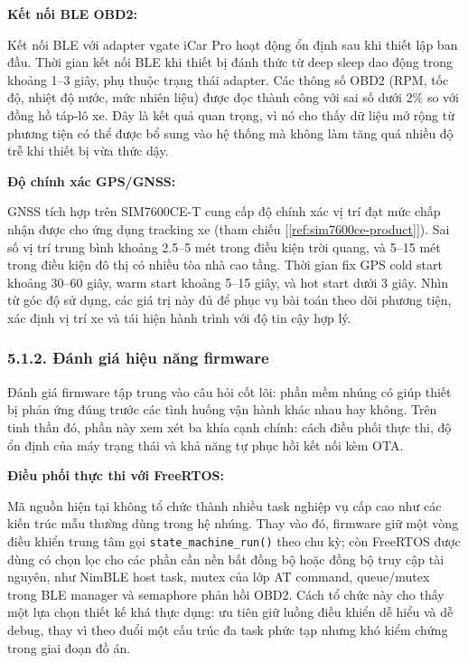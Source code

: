 \documentclass[a4paper]{extarticle}
\newcommand{\ieeecite}[1]{[\ref{#1}]}
\providecommand{\textcite}[1]{\ieeecite{#1}}
\begin{document}
\textbf{Kết nối BLE OBD2:}

Kết nối BLE với adapter vgate iCar Pro hoạt động ổn định sau khi thiết
lập ban đầu. Thời gian kết nối BLE khi thiết bị đánh thức từ deep sleep
dao động trong khoảng 1--3 giây, phụ thuộc trạng thái adapter. Các thông
số OBD2 (RPM, tốc độ, nhiệt độ nước, mức nhiên liệu) được đọc thành công
với sai số dưới 2\% so với đồng hồ táp-lô xe. Đây là kết quả quan trọng,
vì nó cho thấy dữ liệu mở rộng từ phương tiện có thể được bổ sung vào
hệ thống mà không làm tăng quá nhiều độ trễ khi thiết bị vừa thức dậy.

\textbf{Độ chính xác GPS/GNSS:}

GNSS tích hợp trên SIM7600CE-T cung cấp độ chính xác vị trí đạt mức chấp
nhận được cho ứng dụng tracking xe (tham chiếu
\textcite{ref:sim7600ce-product}). Sai số vị trí trung bình khoảng
2.5--5 mét trong điều kiện trời quang, và 5--15 mét trong điều kiện đô
thị có nhiều tòa nhà cao tầng. Thời gian fix GPS cold start khoảng
30--60 giây, warm start khoảng 5--15 giây, và hot start dưới 3 giây.
Nhìn từ góc độ sử dụng, các giá trị này đủ để phục vụ bài toán theo dõi
phương tiện, xác định vị trí xe và tái hiện hành trình với độ tin cậy
hợp lý.

\subsubsection{5.1.2. Đánh giá hiệu năng
firmware}\label{512-ux111uxe1nh-giuxe1-hiux1ec7u-nux103ng-firmware}

Đánh giá firmware tập trung vào câu hỏi cốt lõi: phần mềm nhúng có giúp
thiết bị phản ứng đúng trước các tình huống vận hành khác nhau hay
không. Trên tinh thần đó, phần này xem xét ba khía cạnh chính: cách
điều phối thực thi, độ ổn định của máy trạng thái và khả năng tự phục
hồi kết nối kèm OTA.

\textbf{Điều phối thực thi với FreeRTOS:}

Mã nguồn hiện tại không tổ chức thành nhiều task nghiệp vụ cấp cao như
các kiến trúc mẫu thường dùng trong hệ nhúng. Thay vào đó, firmware giữ
một vòng điều khiển trung tâm gọi \texttt{state\_machine\_run()} theo
chu kỳ; còn FreeRTOS được dùng có chọn lọc cho các phần cần nền bất đồng
bộ hoặc đồng bộ truy cập tài nguyên, như NimBLE host task, mutex của lớp
AT command, queue/mutex trong BLE manager và semaphore phản hồi OBD2.
Cách tổ chức này cho thấy một lựa chọn thiết kế khá thực dụng: ưu tiên
giữ luồng điều khiển dễ hiểu và dễ debug, thay vì theo đuổi một cấu trúc
đa task phức tạp nhưng khó kiểm chứng trong giai đoạn đồ án.
\end{document}
